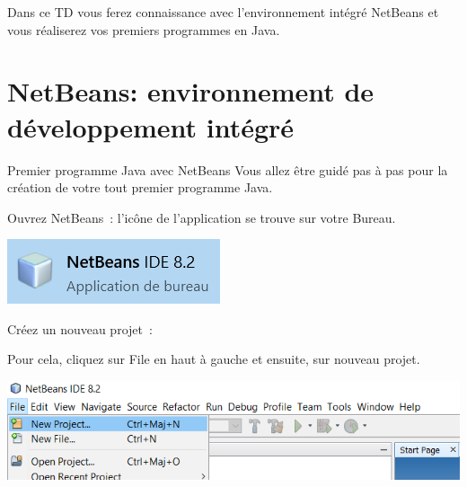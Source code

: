 \documentclass[a4paper,11pt]{article}
\date{2018 -- 2019}
\begin{document}
\entete
\titre

\lastedit


	Dans ce TD vous ferez connaissance avec l'environnement intégré NetBeans et 
	vous réaliserez vos premiers programmes en Java.

	\tableofcontents

	\newpage

\section{NetBeans: environnement de développement intégré }

\begin{Tutoriel}{Premier programme Java avec NetBeans}
	Vous allez être guidé pas à pas pour la création de votre tout premier programme Java.
	
	\begin{steps}
		\item Ouvrez NetBeans~:
			l'icône de l'application se trouve sur votre Bureau. 
		
			\bigskip
			\begin{center}
				\includegraphics{images/nb_icone}
			\end{center}


		\item Créez un nouveau projet~: 
		
			Pour cela, cliquez sur \og File \fg en haut à gauche et ensuite, sur nouveau projet. 
			
			\bigskip
			\begin{center}
				\includegraphics[width=\textwidth]{images/nb_newproject}
			\end{center}
			

\end{steps}
\end{Tutoriel}
\end{document}
